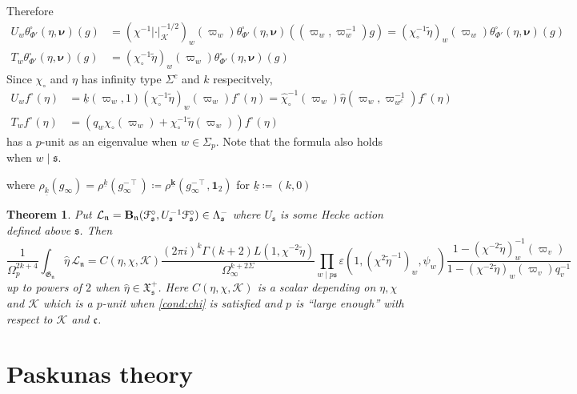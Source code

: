 \documentclass[leqno]{amsart}
\newcommand{\wt}[1]{\underline{ #1 }}
\newcommand{\bwt}[1]{\underline{\boldsymbol { #1 }}}
\newcommand{\euF}{\EuScript{F}} %
\newcommand{\B}{\mathbf{B}} %
\newcommand{\K}{{\mathcal{K}}} %
\newcommand{\bnu}{\boldsymbol{\nu}}
\newcommand{\id}{\mathbf{1}}
\newcommand{\1}{\mathbf{1}}
\newcommand{\fc}{\mathfrak c}
\newcommand{\fs}{\mathfrak s}
\newcommand{\fn}{\mathfrak n}
\newcommand{\fG}{\mathfrak{G}}
\newcommand{\fX}{\mathfrak{X}}
\newcommand{\bw}{{w^c}}
\newtheorem{thm}{Theorem}[section]
\theoremstyle{definition}
\theoremstyle{remark}
\begin{document}
Therefore
\begin{align*}
    U_w\theta^\square_{\Phi'}(\eta,\bnu)(g)&=
    (\chi^{-1}|\cdot|_\K^{-1/2})_w(\varpi_w)
    \theta^\square_{\Phi'}(\eta,\bnu)((\varpi_w,\varpi_w^{-1})g)
    =(\chi_\circ^{-1}\tilde{\eta})_w(\varpi_w)
    \theta^\square_{\Phi'}(\eta,\bnu)(g)\\
    T_w\theta^\square_{\Phi'}(\eta,\bnu)(g)&=
    (\chi_\circ^{-1}\tilde{\eta})_w(\varpi_w)
    \theta^\square_{\Phi'}(\eta,\bnu)(g)
\end{align*}
Since $\chi_\circ$ and $\eta$ has infinity type $\Sigma^c$ and $k$ respecitvely,
\begin{align}
    U_wf^\circ(\eta)&=
    \wt{k}(\varpi_w,1)
    (\chi_\circ^{-1}\tilde{\eta})_w(\varpi_w)f^\circ(\eta)=
    \hat{\chi}_\circ^{-1}(\varpi_w)\hat{\eta}(\varpi_w,\varpi_\bw^{-1})f^\circ(\eta)\\
    T_wf^\circ(\eta)&=
    (q_w\chi_\circ(\varpi_w)
    +\chi_\circ^{-1}\tilde{\eta}(\varpi_w))
    f^\circ(\eta)
\end{align}
has a $p$-unit as an eigenvalue when $w\in \Sigma_p$.
Note that the formula also holds when $w\mid \fs$.


where $\rho_{\wt{k}}(g_\infty)=\rho^{\wt{k}}(g_\infty^{-\intercal})
\coloneqq \rho^{\bwt{k}}(g_\infty^{-\intercal},\id_2)$
for $\wt{k}\coloneqq (k,0)$



\begin{thm}\label{thm:intro2}
    Put $\mathcal{L}_\fn=\B_\fn(\euF^\circ_{\fs},U_\fs^{-1}\euF^\circ_{\fs})
    \in \Lambda_{\fs}^-$
    where $U_\fs$ is some Hecke action defined above $\fs$. Then
    \begin{equation*}
        \frac{1}{\Omega_p^{2k+4}}
        \int_{\fG_{\fn}}\hat{\eta}\,\mathcal{L}_\fn=
    C(\eta,\chi,\K)
    \frac{(2\pi i)^{k}\Gamma(k+2)L(1,\chi^{-2}\tilde{\eta})}{\Omega_\infty^{k+2\Sigma}}
    \prod_{w\mid p\fs}
    \varepsilon(1,(\chi^{2}\tilde{\eta}^{-1})_w,\psi_w)
    \frac{1-(\chi^{-2}\tilde{\eta})^{-1}_w(\varpi_v)}
    {1-(\chi^{-2}\tilde{\eta})_w(\varpi_v)q_v^{-1}}
    \end{equation*}
    up to powers of $2$
    when $\hat{\eta}\in \fX^+_{\fs}$.
    Here $C(\eta,\chi,\K)$ is a scalar depending on $\eta,\chi$ and $\K$
    which is a $p$-unit when \eqref{cond:chi} is satisfied 
    and $p$ is ``large enough''
    with respect to $\K$ and $\fc$. 
\end{thm}

\section{Paskunas theory}
\end{document}
